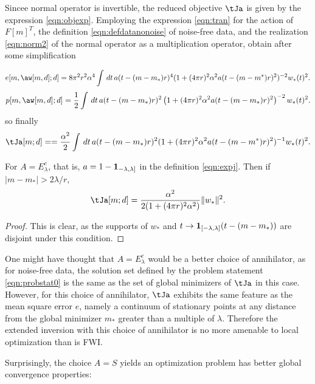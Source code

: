 Sincee normal operator is invertible, the reduced
objective $\tJa$ is given by the expression \ref{eqn:objexp}.
Employing the expression \ref{eqn:tran} for the action of $F[m]^T$,
the definition \ref{eqn:defdatanonoise} of noise-free data,
and the realization \ref{eqn:norm2} of the normal operator as a
multiplication operator, obtain after some simplification

\begin{equation}
  \label{eqn:residnorm}
  e[m,\aw[m,d];d] 
= 8 \pi^2 r^2 \alpha^4\int\,dt\,a(t-(m-m_*)r)^4(1+(4\pi r)^2 \alpha^2 
    a(t-(m-m^*)r)^2)^{-2}w_*(t)^2.
\end{equation}
\begin{equation}
  \label{eqn:anninorm}
  p[m,\aw[m,d];d] = \frac{1}{2}\int \,dt\,  a(t-(m-m_*)r)^2 \left(1+ (4\pi r)^2\alpha^2
    a(t-(m-m_*)r)^2\right)^{-2}w_*(t)^2.
\end{equation}
so finally
\begin{equation}
\label{eqn:expj}
\tJa[m;d] = =\frac{\alpha^2}{2}\int\,dt\,a(t-(m-m_*)r)^2(1+(4\pi r)^2 \alpha^2 
  a(t-(m-m^*)r)^2)^{-1}w_*(t)^2.
\end{equation}

\begin{theorem}
  \label{thm:boxcarbad}
  For $A=E^c_{\lambda}$, that is, $a=1-{\bf 1}_{-\lambda,\lambda]}$ in
  the definition \ref{eqn:expj}. Then if $|m-m_*| >  2\lambda/r$,
  \[
    \tJa[m;d] = \frac{\alpha^2}{2(1+(4 \pi r)^2 \alpha^2)}\|w_*\|^2.
  \]
\end{theorem}

\begin{proof}
  This is clear, as the supports of $w_*$ and $t \rightarrow {\bf
    1}_{[-\lambda,\lambda]}(t-(m-m_*))$ are disjoint under this
  condition.
\end{proof}

One might have thought that $A=E^c_{\lambda}$ would be a better choice
of annihilator, as for noise-free
data, the solution set defined by the problem statement
\ref{eqn:probstat0} is the same as the set of global minimizers of
$\tJa$ in this case. However, for this choice of annihilator,
$\tJa$ exhibits the same feature as the mean square error $e$, namely
a continuum of stationary points at any distance from the global
minimizer $m_*$ greater than a multiple of $\lambda$. Therefore the
extended inversion with this choice of annihilator is no more amenable
to local optimization than is FWI. 

Surprisingly, the choice $A=S$ yields an optimization
problem has better global convergence properties:

